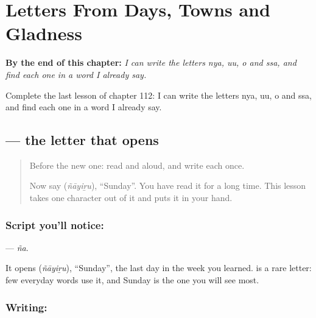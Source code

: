 
\chapter{Letters From Days, Towns and Gladness}
\label{ch:ta-letters-from-days-towns-gladness}

\begin{chapteropening}
\textbf{By the end of this chapter:} \emph{I can write the letters nya, uu, o and ssa, and find each one in a word I already say.}

Complete the last lesson of chapter 112: I can write the letters nya, uu, o and ssa, and find each one in a word I already say.
\end{chapteropening}

\section[\texorpdfstring{\ta{ஞ} (ña)}{ஞ (ña)}]{ — the letter that opens }

\label{lesson:TA-S137-letter-nya}



\begin{quote}
Before the new one: read  and  aloud, and write each once.

Now say \textbf{} (\emph{ñāyiṟu}), \textquotedblleft{}Sunday\textquotedblright{}. You have read it for a long time. This lesson takes one character out of it and puts it in your hand.
\end{quote}

\subsection*{Script you'll notice: }
\textbf{} — \emph{ña}.

It opens \textbf{} (\emph{ñāyiṟu}), \textquotedblleft{}Sunday\textquotedblright{}, the last day in the week you learned.  is a rare letter: few everyday words use it, and Sunday is the one you will see most.

\subsection*{Writing: }

